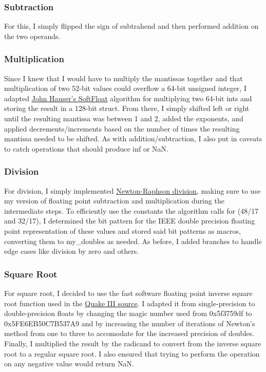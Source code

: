 \documentclass[12pt]{article}%
\begin{document}
\subsubsection{Subtraction}
For this, I simply flipped the sign of subtrahend and then performed addition on the two operands.
\subsubsection{Multiplication}
Since I knew that I would have to multiply the mantissas together and that multiplication of two 52-bit values could overflow a 64-bit unsigned integer, I adapted 
\href{http://www.jhauser.us/arithmetic/SoftFloat.html}{John Hauser's SoftFloat}
algorithm for multiplying two 64-bit ints and storing the result in a 128-bit struct. From there, I simply shifted left or right until the resulting mantissa was between 1 and 2, added the exponents, and applied decrements/increments based on the number of times the resulting mantissa needed to be shifted. As with addition/subtraction, I also put in caveats to catch operations that should produce inf or NaN.
\subsubsection{Division}
For division, I simply implemented 
\href{https://en.wikipedia.org/wiki/Division_algorithm\#Newton.E2.80.93Raphson_division}{Newton-Raphson division}, making sure to use my version of floating point subtraction and multiplication during the intermediate steps. To efficiently use the constants the algorithm calls for (48/17 and 32/17), I determined the bit pattern for the IEEE double precision floating point representation of these values and stored said bit patterns as macros, converting them to my\_doubles as needed. As before, I added branches to handle edge cases like division by zero and others.
\subsubsection{Square Root}
For square root, I decided to use the fast software floating point inverse square root function used in the 
\href{https://github.com/id-Software/Quake-III-Arena/blob/master/code/game/q_math.c\#L552}{Quake III source}. I adapted it from single-precision to double-precision floats by changing the magic number used from 0x5f3759df to 0x5FE6EB50C7B537A9 and by increasing the number of iterations of Newton's method from one to three to accomodate for the increased precision of doubles. Finally, I multiplied the result by the radicand to convert from the inverse square root to a regular square root. I also ensured that trying to perform the operation on any negative value would return NaN.
\end{document}
